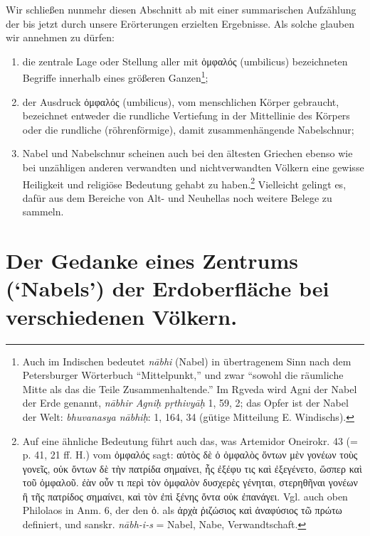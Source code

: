 \documentclass[a4paper, 11pt, oneside]{article}
\begin{document}
Wir schließen nunmehr diesen Abschnitt ab mit einer summarischen Aufzählung der bis jetzt durch unsere Erörterungen erzielten Ergebnisse. Als solche glauben wir annehmen zu dürfen:
\begin{enumerate}
    \item die zentrale Lage oder Stellung aller mit ὀμφαλός (umbilicus) bezeichneten Begriffe innerhalb eines größeren Ganzen\footnote{Auch im Indischen bedeutet \emph{nābhi} (Nabel) in übertragenem Sinn nach dem Petersburger Wörterbuch "`Mittelpunkt,"' und zwar "`sowohl die räumliche Mitte als das die Teile Zusammenhaltende."' Im Rgveda wird Agni der Nabel der Erde genannt, \emph{nābhir Agniḥ pṛthivyāḥ} 1, 59, 2; das Opfer ist der Nabel der Welt: \emph{bhuvanasya nābhiḥ}: 1, 164, 34 (gütige Mitteilung E. Windischs).};

    \item der Ausdruck ὀμφαλός (umbilicus), vom menschlichen Körper gebraucht, bezeichnet entweder die rundliche Vertiefung in der Mittellinie des Körpers oder die rundliche (röhrenförmige), damit zusammenhängende Nabelschnur;

    \item Nabel und Nabelschnur scheinen auch bei den ältesten Griechen ebenso wie bei unzähligen anderen verwandten und nichtverwandten Völkern eine gewisse Heiligkeit und religiöse Bedeutung gehabt zu haben.\footnote{Auf eine ähnliche Bedeutung führt auch das, was Artemidor Oneirokr. 43 (= p. 41, 21 ff. H.) vom ὀμφαλός sagt: αὐτὸς δὲ ὁ ὀμφαλὸς ὄντων μὲν γονέων τοὺς γονεῖς, οὐκ ὄντων δὲ τὴν πατρίδα σημαίνει, ἧς ἐξέφυ τις καὶ ἐξεγένετο, ὥσπερ καὶ τοῦ ὀμφαλοῦ. ἐὰν οὖν τι περὶ τὸν ὀμφαλὸν δυσχερὲς γένηται, στερηθῆναι γονέων ἢ τῆς πατρίδος σημαίνει, καὶ τὸν ἐπὶ ξένης ὄντα οὐκ ἐπανάγει. Vgl. auch oben Philolaos in Anm. 6, der den ὀ. als ἀρχὰ ῥιζώσιος καὶ ἀναφύσιος τῶ πρώτω definiert, und sanskr. \emph{nābh-i-s} = Nabel, Nabe, Verwandtschaft.} Vielleicht gelingt es, dafür aus dem Bereiche von Alt- und Neuhellas noch weitere Belege zu sammeln.
\end{enumerate}
\clearpage
\section{Der Gedanke eines Zentrums (`Nabels') der Erdoberfläche bei verschiedenen Völkern.}
\end{document}
